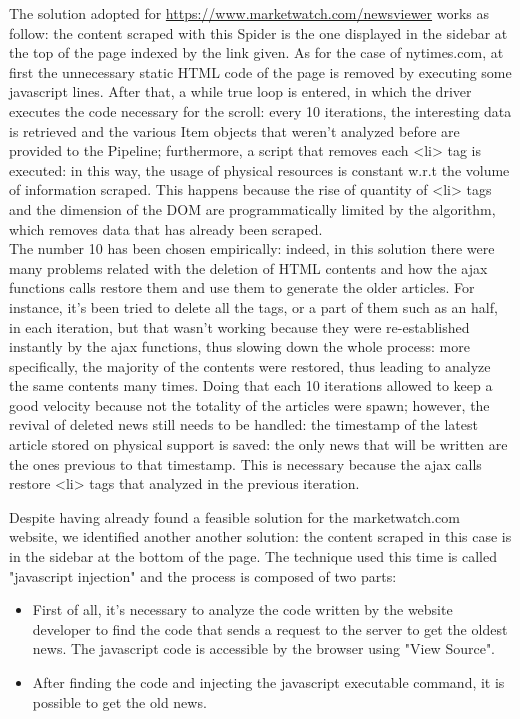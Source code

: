 \par 
The solution adopted for \url{https://www.marketwatch.com/newsviewer} works as follow: the content scraped with this Spider is the one displayed in the sidebar at the top of the page indexed by the link given. As for the case of nytimes.com, at first the unnecessary static HTML code of the page is removed by executing some javascript lines. After that, a while true loop is entered, in which the driver executes the code necessary for the scroll: every 10 iterations, the interesting data is retrieved and the various Item objects that weren't analyzed before are provided to the Pipeline; furthermore, a script that removes each <li> tag is executed: in this way, the usage of physical resources is constant w.r.t the volume of information scraped. This happens because the rise of quantity of <li> tags and the dimension of the DOM are programmatically limited by the algorithm, which removes data that has already been scraped.\\
The number 10 has been chosen empirically: indeed, in this solution there were many problems related with the deletion of HTML contents and how the ajax functions calls restore them and use them to generate the older articles. For instance, it's been tried to delete all the tags, or a part of them such as an half, in each iteration, but that wasn't working because they were re-established instantly by the ajax functions, thus slowing down the whole process: more specifically, the majority of the contents were restored, thus leading to analyze the same contents many times. Doing that each 10 iterations allowed to keep a good velocity because not the totality of the articles were spawn; however, the revival of deleted news still needs to be handled: the timestamp of the latest article stored on physical support is saved: the only news that will be written are the ones previous to that timestamp. This is necessary because the ajax calls restore <li> tags that analyzed in the previous iteration. 
\par 
Despite having already found a feasible solution for the marketwatch.com website, we identified another  another solution: the content scraped in this case is in the sidebar at the bottom of the page. The technique used this time is called "javascript injection" and the process is composed of two parts:
\begin{itemize}
	\item First of all, it's necessary to analyze the code written by the website developer to find the code that sends a request to the server to get the oldest news. The javascript code is accessible by the browser using "View Source".
	\item After finding the code and injecting the javascript executable command, it is possible to get the old news.
\end{itemize}
